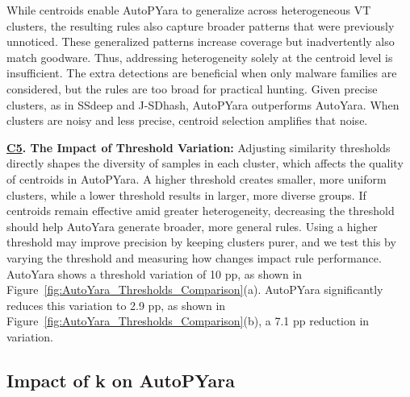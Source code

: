 While centroids enable AutoPYara to generalize across heterogeneous VT clusters, the resulting rules also capture broader patterns that were previously unnoticed. These generalized patterns increase coverage but inadvertently also match goodware. Thus, addressing heterogeneity solely at the centroid level is insufficient. The extra detections are beneficial when only malware families are considered, but the rules are too broad for practical hunting. Given precise clusters, as in SSdeep and J-SDhash, AutoPYara outperforms AutoYara. When clusters are noisy and less precise, centroid selection amplifies that noise.

\noindent \textbf{\underline{C5}. The Impact of Threshold Variation:} Adjusting similarity thresholds directly shapes the diversity of samples in each cluster, which affects the quality of centroids in AutoPYara. A higher threshold creates smaller, more uniform clusters, while a lower threshold results in larger, more diverse groups. If centroids remain effective amid greater heterogeneity, decreasing the threshold should help AutoYara generate broader, more general rules. Using a higher threshold may improve precision by keeping clusters purer, and we test this by varying the threshold and measuring how changes impact rule performance. AutoYara shows a threshold variation of 10 pp, as shown in Figure~\ref{fig:AutoYara_Thresholds_Comparison}(a). AutoPYara significantly reduces this variation to 2.9 pp, as shown in Figure~\ref{fig:AutoYara_Thresholds_Comparison}(b), a 7.1 pp reduction in variation.
\vspace{-2mm}

\subsection{Impact of k on AutoPYara }
\label{subsec:AutoPYaraKEval}
\vspace{-2mm}



